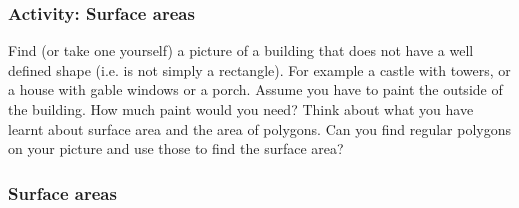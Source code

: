     \addtocounter{footnote}{-0}
    
 \par 

\label{m39357*eip-630}
            \subsubsection{ Activity: Surface areas}
            \nopagebreak
            \label{m39357*eip-802}
Find (or take one yourself) a picture of a building that does not have a well defined shape (i.e. is not simply a rectangle). For example a castle with towers, or a house with gable windows or a porch. Assume you have to paint the outside of the building. How much paint would you need? Think about what you have learnt about surface area and the area of polygons. Can you find regular polygons on your picture and use those to find the surface area?
\par \label{m39357*secfhsst!!!underscore!!!id113}
            \subsubsection{  Surface areas }
            \nopagebreak
            
